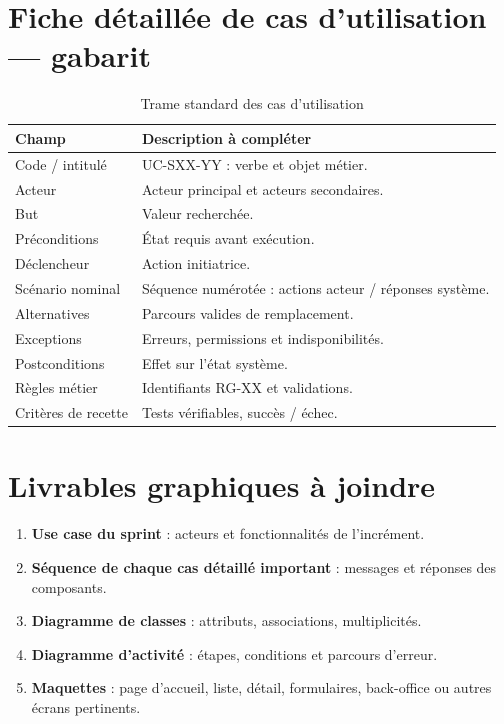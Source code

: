 \section{Fiche détaillée de cas d’utilisation --- gabarit}
\begin{table}[htbp]\centering\small
\caption{Trame standard des cas d’utilisation}
\begin{tabularx}{\textwidth}{@{}P{36mm}Y@{}}\toprule\textbf{Champ} & \textbf{Description à compléter}\\\midrule
Code / intitulé & UC-SXX-YY : verbe et objet métier.\\
Acteur & Acteur principal et acteurs secondaires.\\
But & Valeur recherchée.\\
Préconditions & État requis avant exécution.\\
Déclencheur & Action initiatrice.\\
Scénario nominal & Séquence numérotée : actions acteur / réponses système.\\
Alternatives & Parcours valides de remplacement.\\
Exceptions & Erreurs, permissions et indisponibilités.\\
Postconditions & Effet sur l’état système.\\
Règles métier & Identifiants RG-XX et validations.\\
Critères de recette & Tests vérifiables, succès / échec.\\
\bottomrule\end{tabularx}\end{table}

\section{Livrables graphiques à joindre}
\begin{enumerate}
\item \textbf{Use case du sprint} : acteurs et fonctionnalités de l’incrément.
\item \textbf{Séquence de chaque cas détaillé important} : messages et réponses des composants.
\item \textbf{Diagramme de classes} : attributs, associations, multiplicités.
\item \textbf{Diagramme d’activité} : étapes, conditions et parcours d’erreur.
\item \textbf{Maquettes} : page d’accueil, liste, détail, formulaires, back-office ou autres écrans pertinents.
\end{enumerate}
